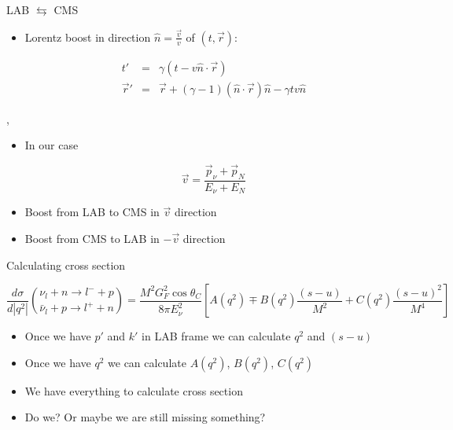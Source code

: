 \begin{slide}{LAB $\leftrightarrows$ CMS}
\null\vfill

  \begin{itemize}
    
    \item Lorentz boost in direction $\hat n = \frac{\vec v}{v}$ of $(t,\vec r)$:
    
    \begin{eqnarray*}
      t' & = & \gamma \left(t - v \hat n\cdot\vec r\right) \\
      \vec r' & = & \vec r + (\gamma - 1)(\hat n\cdot\vec r)\hat n - \gamma t v \hat n
    \end{eqnarray*}
    
  \end{itemize}
  
  \sep
  
  \twocolumn
  {
    \begin{itemize}
      
      \item In our case
  
      $$\vec v = \frac{\vec p_\nu + \vec p_N}{E_\nu + E_N}$$
    
      \item Boost from LAB to CMS in $\vec v$ direction
    
      \item Boost from CMS to LAB in $-\vec v$ direction
    
    \end{itemize}
  }
  {
    
  }
  
\vfill\null
\end{slide}

\begin{wideslide}[toc=Cross section]{Calculating cross section}
\null\vfill

  
  $$\frac{d\sigma}{d|q^2|} {{\nu_l + n \rightarrow l^- + p}\choose{\bar\nu_l + p \rightarrow l^+ + n}} = \frac{M^2G_F^2\cos\theta_C}{8\pi E_\nu^2}\left[A(q^2) \mp B(q^2)\frac{(s - u)}{M^2} + C(q^2)\frac{(s - u)^2}{M^4}\right]$$
  

  \begin{itemize}
    \item Once we have $p'$ and $k'$ in LAB frame we can calculate $q^2$ and $(s - u)$
    \item Once we have $q^2$ we can calculate $A(q^2)$, $B(q^2)$, $C(q^2)$
    \item We have everything to calculate cross section
    \item Do we? Or maybe we are still missing something?
  \end{itemize}

\vfill\null
\end{wideslide}

